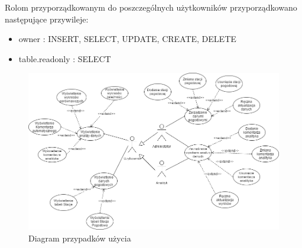 \documentclass[12pt,a4paper]{article}
\begin{document}
\begin{table}[!htb]
\centering 
\end{table}

Rolom przyporządkowanym do poszczególnych użytkowników przyporządkowano następujące przywileje:
\begin{itemize}
\item owner : INSERT, SELECT, UPDATE, CREATE, DELETE
\item table.readonly : SELECT
\end{itemize}

\begin{figure}[!htb]
\includegraphics[width=\textwidth]{./figures/DiagramPrzypadkowUzycia.png}
\caption{Diagram przypadków użycia}
\end{figure}
 
\end{document}
